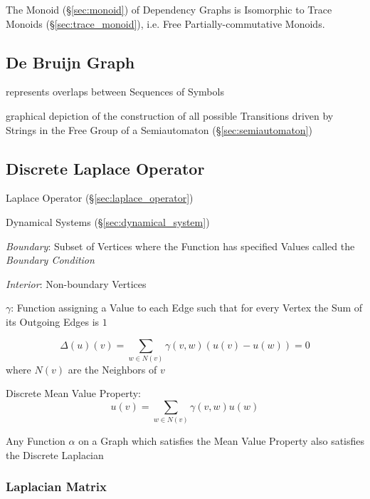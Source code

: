 The Monoid (\S\ref{sec:monoid}) of Dependency Graphs is Isomorphic to
Trace Monoids (\S\ref{sec:trace_monoid}), i.e. Free
Partially-commutative Monoids.



\subsection{De Bruijn Graph}\label{sec:debruijn_graph}

represents overlaps between Sequences of Symbols

graphical depiction of the construction of all possible Transitions
driven by Strings in the Free Group of a Semiautomaton
(\S\ref{sec:semiautomaton})




\subsection{Discrete Laplace Operator}\label{sec:discrete_laplace}

Laplace Operator (\S\ref{sec:laplace_operator})

Dynamical Systems (\S\ref{sec:dynamical_system})

\emph{Boundary}: Subset of Vertices where the Function has specified
Values called the \emph{Boundary Condition}

\emph{Interior}: Non-boundary Vertices

$\gamma$: Function assigning a Value to each Edge such that for every
Vertex the Sum of its Outgoing Edges is $1$

\[
  \Delta(u)(v) = \sum_{w \in N(v)} \gamma(v,w)(u(v) - u(w)) = 0
\]
where $N(v)$ are the Neighbors of $v$


Discrete Mean Value Property:
\[
  u(v) = \sum_{w \in N(v)} \gamma (v,w)u(w)
\]

Any Function $\alpha$ on a Graph which satisfies the Mean Value
Property also satisfies the Discrete Laplacian



\subsubsection{Laplacian Matrix}\label{sec:laplacian_matrix}

